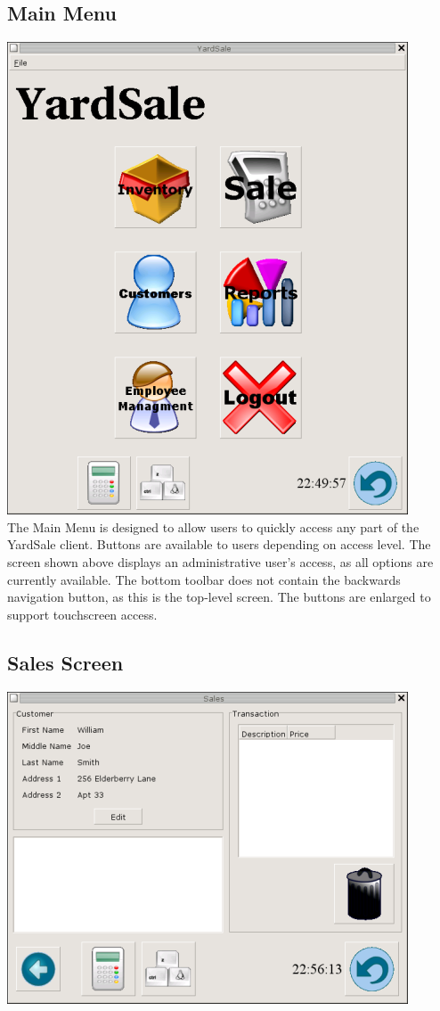\documentclass{report}
\begin{document}
    \subsection{Main Menu}
    \includegraphics{ys_main_screener.png}\\

    The Main Menu is designed to allow users to quickly
    access any part of the YardSale client.  Buttons are available
    to users depending on access level.  The screen shown above
    displays an administrative user's access, as all options are
    currently available. The bottom toolbar does not contain the
    backwards navigation button, as this is the top-level screen.
    The buttons are enlarged to support touchscreen access.\\

    \subsection{Sales Screen}
    \includegraphics{ys_sales_screener.png}\\
\end{document}
